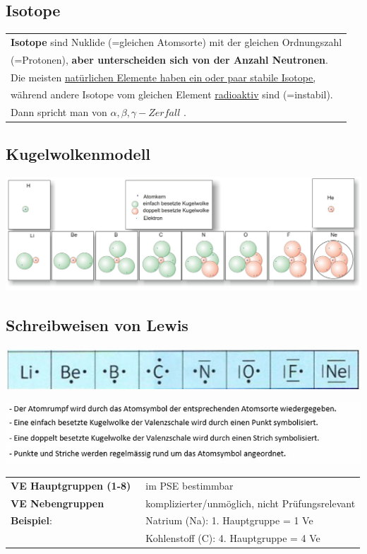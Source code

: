 \subsection{Isotope}
\small{\begin{tabular}{l}
	\textbf{Isotope} sind Nuklide (=gleichen Atomsorte) mit der gleichen Ordnungszahl    \\
	(=Protonen),
	\textbf{aber unterscheiden sich von der Anzahl Neutronen}.             \\
	Die meisten \underline{natürlichen Elemente haben ein oder paar stabile Isotope,}    \\
	während andere Isotope vom gleichen Element \underline{radioaktiv} sind (=instabil). \\
	Dann spricht man von $\alpha , \beta , \gamma -Zerfall$ .
\end{tabular}
}

\subsection{Kugelwolkenmodell}	
\begin{center}
	\includegraphics[width=\columnwidth]{images/kugelwolkenmodell.jpg}
\end{center}

\subsection{Schreibweisen von Lewis} 

\begin{center}
	\includegraphics[width=\columnwidth]{images/Lewis-schreibweise_2.png}
\end{center}

\begin{flushleft}
	\includegraphics[width=0.7\columnwidth]{images/lewis-schreibweise.png}
\end{flushleft}
\small{
\begin{tabular}{ll}
	\textbf{VE Hauptgruppen (1-8)}~ &  im PSE bestimmbar \\
	\textbf{VE Nebengruppen}  &  komplizierter/unmöglich, nicht Prüfungsrelevant\\
	\hline
	\textbf{Beispiel}: & Natrium (Na): 1. Hauptgruppe = 1 Ve \\
	& Kohlenstoff (C): 4. Hauptgruppe = 4 Ve  \\
\end{tabular}
}
